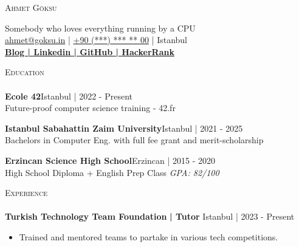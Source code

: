 \documentclass[a4paper]{article}
\newcommand{\lineunder} {
    \vspace*{-8pt} \\
    \hspace*{-18pt} \hrulefill \\
}
\newcommand{\header} [1] {
    {\hspace*{-18pt}\vspace*{6pt} \textsc{#1}}
    \vspace*{-6pt} \lineunder
}
\begin{document}
    \vspace*{-40pt}

    

%
%
  \vspace*{-2pt}
  \begin{center}
    {\Huge \scshape {Ahmet Göksu}}\\
    \vspace*{2pt}
    
    
    Somebody who loves everything running by a CPU\\
    \vspace*{2pt}
    \vspace*{2pt}
    \href{mailto:ahmet@goksu.in}{ahmet@goksu.in} | \href{tel:+90 (***) *** ** **}{+90 (***) *** ** 00} | Istanbul\\
    \vspace*{2pt}
    \textbf{\href{https://ahmet.goksu.in}{Blog | }}\textbf{\href{https://www.linkedin.com/in/ahmetgoksu}{Linkedin | }}\textbf{\href{https://www.github.com/goeksu}{GitHub | }}\textbf{\href{https://www.hackerrank.com/goeksu}{HackerRank}}\\
  \end{center}



      \header{Education}
      \vspace{2mm}
      \textbf{Ecole 42}\hfill Istanbul | 2022 - Present\\
Future-proof computer science training - 42.fr 

\vspace{2mm}
      \textbf{Istanbul Sabahattin Zaim University}\hfill Istanbul | 2021 - 2025\\
Bachelors in Computer Eng. with full fee grant and merit-scholarship 

\vspace{2mm}
      \textbf{Erzincan Science High School}\hfill Erzincan | 2015 - 2020\\
High School Diploma + English Prep Class 
{\sl GPA: 82/100}\\
\vspace{2mm}

      \header{Experience}
      \vspace{2mm}
  \textbf{Turkish Technology Team Foundation}\textbf{ | Tutor} \hfill Istanbul | 2023 - Present\\
          \vspace{-3mm}
\begin{itemize} \itemsep -3pt
\item[] Trained and mentored teams to partake in various tech competitions.
\end{itemize}
   
\end{document}
